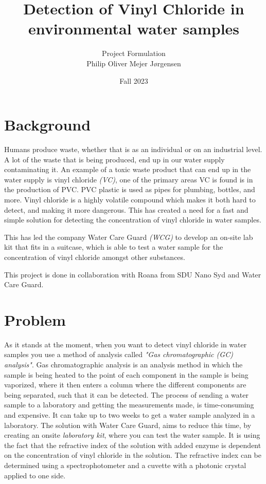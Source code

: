 \documentclass{article}
\title{Detection of Vinyl Chloride in environmental water samples}
\author{Project Formulation\\Philip Oliver Mejer Jørgensen}
\date{Fall 2023}
\begin{document}
\maketitle

\section*{Background}
Humans produce waste, whether that is as an individual or on an industrial level. A lot of the waste that is being produced, end up in our water supply contaminating it.
An example of a toxic waste product that can end up in the water supply is vinyl chloride \textit{(VC)}, one of the primary areas VC is found is in the production of PVC.
PVC plastic is used as pipes for plumbing, bottles, and more\cite{pvc_applications}.
Vinyl chloride is a highly volatile compound which makes it both hard to detect, and making it more dangerous.
This has created a need for a fast and simple solution for detecting the concentration of vinyl chloride in water samples.

This has led the company Water Care Guard \textit{(WCG)} to develop an on-site lab kit that fits in a suitcase, which is able to test a water sample for the concentration of vinyl chloride amongst other substances.

This project is done in collaboration with Roana from SDU Nano Syd and Water Care Guard.

\vspace{15mm}

\section*{Problem}
As it stands at the moment, when you want to detect vinyl chloride in water samples you use a method of analysis called \textit{"Gas chromatographic (GC) analysis"}\cite{vc_who}.
Gas chromatographic analysis is an analysis method in which the sample is being heated to the point of each component in the sample is being vaporized, where it then enters a column where the different components are being separated, such that it can be detected.\cite{gc_shimadzu}
The process of sending a water sample to a laboratory and getting the measurements made, is time-consuming and expensive.
It can take up to two weeks to get a water sample analyzed in a laboratory.\cite{water_analysis_cwt}
The solution with Water Care Guard, aims to reduce this time, by creating an onsite \textit{laboratory kit}, where you can test the water sample.
It is using the fact that the refractive index of the solution with added enzyme is dependent on the concentration of vinyl chloride in the solution.
The refractive index can be determined using a spectrophotometer and a cuvette with a photonic crystal applied to one side.\cite{ri_dtu}\\
\end{document}
